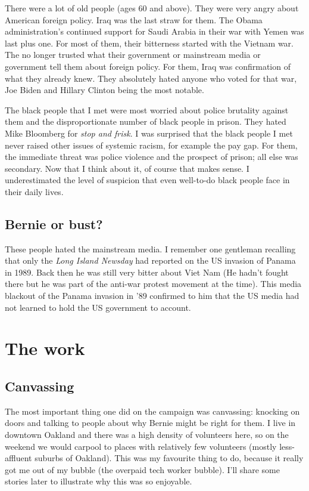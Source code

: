 \documentclass[]{book}
\begin{document}
There were a lot of old people (ages 60 and above). They were very angry about American foreign policy. Iraq was the last straw for them. The Obama administration's continued support for Saudi Arabia in their war with Yemen was last plus one. For most of them, their bitterness started with the Vietnam war. The no longer trusted what their government or mainstream media or government tell them about foreign policy. For them, Iraq was confirmation of what they already knew. They absolutely hated anyone who voted for that war, Joe Biden and Hillary Clinton being the most notable.

The black people that I met were most worried about police brutality against them and the disproportionate number of black people in prison. They hated Mike Bloomberg for \emph{stop and frisk}. I was surprised that the black people I met never raised other issues of systemic racism, for example the pay gap. For them, the immediate threat was police violence and the prospect of prison; all else was secondary. Now that I think about it, of course that makes sense. I underestimated the level of suspicion that even well-to-do black people face in their daily lives.

\hypertarget{bernie-or-bust}{%
\section{Bernie or bust?}\label{bernie-or-bust}}

These people hated the mainstream media. I remember one gentleman recalling that only the \emph{Long Island Newsday} had reported on the US invasion of Panama in 1989. Back then he was still very bitter about Viet Nam (He hadn't fought there but he was part of the anti-war protest movement at the time). This media blackout of the Panama invasion in '89 confirmed to him that the US media had not learned to hold the US government to account.

\hypertarget{the-work}{%
\chapter{The work}\label{the-work}}

\hypertarget{canvassing}{%
\section{Canvassing}\label{canvassing}}

The most important thing one did on the campaign was canvassing: knocking on doors and talking to people about why Bernie might be right for them. I live in downtown Oakland and there was a high density of volunteers here, so on the weekend we would carpool to places with relatively few volunteers (mostly less-affluent suburbs of Oakland). This was my favourite thing to do, because it really got me out of my bubble (the overpaid tech worker bubble). I'll share some stories later to illustrate why this was so enjoyable.
\end{document}
